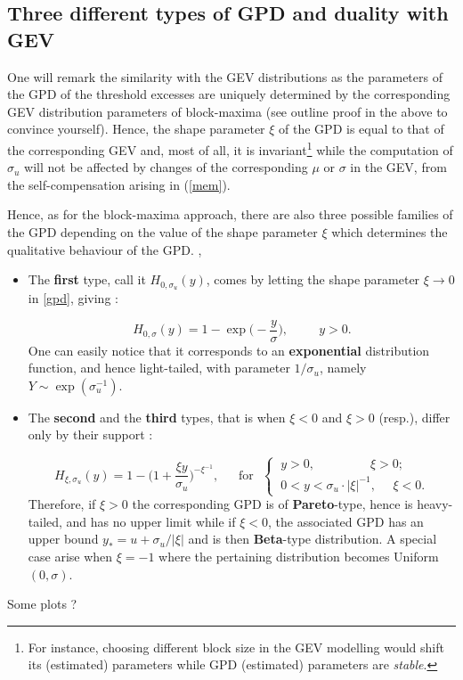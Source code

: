 \documentclass[11pt,a4paper,openany ]{book}
\begin{document}
\subsection{Three different types of GPD and duality with GEV} One will remark the similarity with the GEV distributions as the parameters of the GPD of the threshold excesses are uniquely determined by the corresponding GEV distribution parameters of block-maxima (see outline proof in the above to convince yourself). Hence, the shape parameter $\xi$ of the GPD is equal to that of the corresponding GEV and, most of all, it is invariant\footnote{For instance, choosing different block size in the GEV modelling would shift its (estimated) parameters while GPD  (estimated) parameters are \emph{stable}. } while the computation of $\sigma_u$ will not be affected by changes of the corresponding $\mu$ or $\sigma$ in the GEV, from the self-compensation arising in (\ref{mem}). \cite[pp.76]{coles_introduction_2001}

Hence, as for the block-maxima approach, there are also three possible families of the GPD depending on the value of the shape parameter $\xi$ which determines the qualitative behaviour of the GPD. \cite{hosking_parameter_1987}, \cite{singh_parameter_1995}

\begin{itemize}
	\item The \textbf{first} type, call it $H_{0,\sigma_u}(y)$, comes by letting the shape parameter $\xi\rightarrow 0$ in \ref{gpd}, giving :
	
	\begin{equation}\label{gpd0}
	H_{0,\sigma}(y)=1-\exp
	\Big(-\frac{y}{\sigma}\Big), \ \ \ \ \ \ \ \ \ \ \ y>0.
	\end{equation}
	One can easily notice that it corresponds to an \textbf{exponential} distribution 
	function, and hence light-tailed, with parameter $1/ \sigma_u$, namely 
	$Y\sim\exp(\sigma_u^{-1})$.
	
	\item The \textbf{second} and the \textbf{third} types, that is when $\xi<0$ and $\xi>0$ (resp.), differ only by their support : 
	
	\begin{equation}\label{gpdm}
	H_{\xi,\sigma_u}(y)=1-\bigg(1+\frac{\xi y}{\sigma_u}\bigg)^{-\xi^{-1}}, \ \ \ \ \  \ \ \text{for} \ \ \ \begin{cases}
	\ y>0,  \ \ \ \ \ \ \ \ \ \ \ \ \ \ \ \  \ \ \ \ \xi>0; \\
	\  0<y<\sigma_u\cdot|\xi|^{-1}, \ \ \ \  \  \  \xi<0.
	\end{cases}
	\end{equation}
	Therefore, if $\xi>0$ the corresponding GPD is of \textbf{Pareto}-type, hence is heavy-tailed, and has no upper limit while if $\xi<0$, the associated GPD has an upper bound $y_*=u+\sigma_u/|\xi|$ and is then \textbf{Beta}-type distribution. A special case arise when $\xi=-1$ where the pertaining distribution becomes Uniform$(0,\sigma)$. \cite[pp.186]{grimshaw_computing_1993}
	
	
\end{itemize}
Some plots ? 
\end{document}
